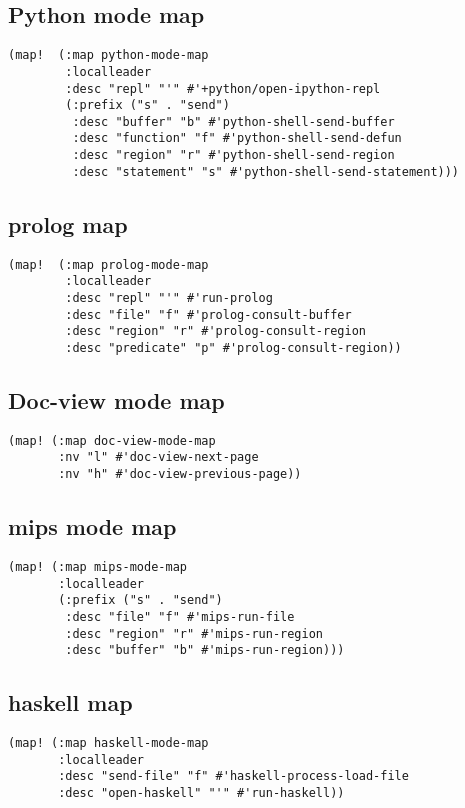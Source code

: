 \documentclass[11pt]{article}
\begin{document}
\subsection*{Python mode map}
\label{sec:orgfdb0abd}
\begin{verbatim}
(map!  (:map python-mode-map
        :localleader
        :desc "repl" "'" #'+python/open-ipython-repl
        (:prefix ("s" . "send")
         :desc "buffer" "b" #'python-shell-send-buffer
         :desc "function" "f" #'python-shell-send-defun
         :desc "region" "r" #'python-shell-send-region
         :desc "statement" "s" #'python-shell-send-statement)))
\end{verbatim}
\subsection*{prolog map}
\label{sec:org5997952}
\begin{verbatim}
(map!  (:map prolog-mode-map
        :localleader
        :desc "repl" "'" #'run-prolog
        :desc "file" "f" #'prolog-consult-buffer
        :desc "region" "r" #'prolog-consult-region
        :desc "predicate" "p" #'prolog-consult-region))
\end{verbatim}

\subsection*{Doc-view mode map}
\label{sec:org1189e5d}
\begin{verbatim}
(map! (:map doc-view-mode-map
       :nv "l" #'doc-view-next-page
       :nv "h" #'doc-view-previous-page))
\end{verbatim}
\subsection*{mips mode map}
\label{sec:org677d6e1}
\begin{verbatim}
(map! (:map mips-mode-map
       :localleader
       (:prefix ("s" . "send")
        :desc "file" "f" #'mips-run-file
        :desc "region" "r" #'mips-run-region
        :desc "buffer" "b" #'mips-run-region)))
\end{verbatim}
\subsection*{haskell map}
\label{sec:org5a8c77c}
\begin{verbatim}
(map! (:map haskell-mode-map
       :localleader
       :desc "send-file" "f" #'haskell-process-load-file
       :desc "open-haskell" "'" #'run-haskell))
\end{verbatim}
\end{document}
